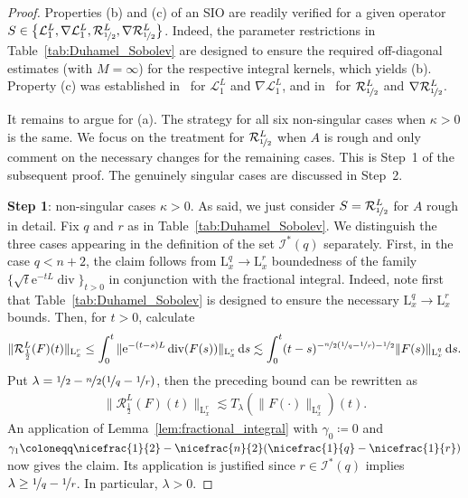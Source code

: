 \documentclass[11pt, leqno]{amsart}
\theoremstyle{definition}
\renewcommand{\L}{\mathrm{L}}
\newcommand{\Sol}{\mathcal{R}}
\newcommand{\Soll}{\mathcal{L}}
\newcommand{\e}{\mathrm{e}}
\renewcommand{\d}{\,\mathrm{d}}
\DeclareMathOperator{\Div}{div}
\newcommand{\SobSet}{\mathcal{I}}
\begin{document}
	\begin{proof}
		Properties (b) and (c) of an SIO are readily verified for a given operator $S \in \bigl\{ \Soll^L_1, \nabla \Soll^L_1, \Sol^L_{\nicefrac{1}{2}}, \nabla \Sol^L_{\nicefrac{1}{2}} \bigr\}$. Indeed, the parameter restrictions in Table~\ref{tab:Duhamel_Sobolev} are designed to ensure the required off-diagonal estimates (with $M = \infty$) for the respective integral kernels, which yields (b). Property (c) was established in~\cite[Prop.~4.1]{AH2} for $\Soll^L_1$ and $\nabla \Soll^L_1$, and in~\cite[Prop.~5.8]{AH3} for $\Sol^L_{\nicefrac{1}{2}}$ and $\nabla \Sol^L_{\nicefrac{1}{2}}$.

		It remains to argue for (a). The strategy for all six non-singular cases when $\kappa >0$ is the same. We focus on the treatment for $\Sol^L_{\nicefrac{1}{2}}$ when $A$ is rough and only comment on the necessary changes for the remaining cases. This is Step~1 of the subsequent proof. The genuinely singular cases are discussed in Step~2.

		\textbf{Step 1}: non-singular cases $\kappa > 0$. As said, we just consider $S = \Sol^L_{\nicefrac{1}{2}}$ for $A$ rough in detail. Fix $q$ and $r$ as in Table~\ref{tab:Duhamel_Sobolev}.
		We distinguish the three cases appearing in the definition of the set $\SobSet^*(q)$ separately.
		First, in the case $q < n+2$, the claim follows from $\L^q_x \to \L^r_x$ boundedness of the family $\{ \sqrt{t} \e^{-tL} \Div \}_{t>0}$ in conjunction with the fractional integral. Indeed, note first that Table~\ref{tab:Duhamel_Sobolev} is designed to ensure the necessary $\L^q_x \to \L^r_x$ bounds. Then, for $t>0$, calculate
		\begin{align}
			\| \Sol^L_\frac{1}{2}(F)(t) \|_{\L^r_x} \leq \int_0^t \| \e^{-(t-s)L} \Div(F(s))\|_{\L^r_x} \d s \lesssim \int_0^t (t-s)^{-\nicefrac{n}{2}(\nicefrac{1}{q} - \nicefrac{1}{r}) - \nicefrac{1}{2}} \| F(s) \|_{\L^q_x} \d s.
		\end{align}
		Put $\lambda = \nicefrac{1}{2} - \nicefrac{n}{2}(\nicefrac{1}{q} - \nicefrac{1}{r})$, then the preceding bound can be rewritten as
		\begin{align}
			\| \Sol^L_\frac{1}{2}(F)(t) \|_{\L^r_x} \lesssim T_\lambda(\| F(\cdot) \|_{\L^q_x})(t).
		\end{align}
		An application of Lemma~\ref{lem:fractional_integral} with $\gamma_0 \coloneqq 0$ and $\gamma_1 \coloneqq \nicefrac{1}{2} -\nicefrac{n}{2}(\nicefrac{1}{q} - \nicefrac{1}{r})$ now gives the claim. Its application is justified since $r \in \SobSet^*(q)$ implies $\lambda \geq \nicefrac{1}{q} - \nicefrac{1}{r}$. In particular, $\lambda > 0$.


\end{proof}
\end{document}
